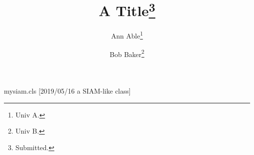 \begin{filecontents*}[overwrite]{mysiam.cls}
[2019/05/16 a SIAM-like class]
\renewcommand\maketitle{\par
  \begingroup
    \renewcommand{\thefootnote}{\fnsymbol{footnote}}%
    \@maketitle
    \@thanks
  \endgroup
  \setcounter{footnote}{0}%
  \let\maketitle\relax\let\@maketitle\relax}
\end{filecontents*}
\documentclass{mysiam}
\title{A Title\thanks{Submitted.}}
\author{Ann Able\thanks{Univ A.} \and Bob Baker\thanks{Univ B.}}

\maketitle
Body.

